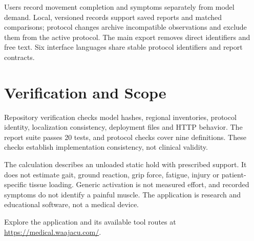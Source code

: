 Users record movement completion and symptoms separately from model demand.
Local, versioned records support saved reports and matched comparisons;
protocol changes archive incompatible observations and exclude them from the
active protocol. The main export removes direct identifiers and free text. Six interface
languages share stable protocol identifiers and report contracts.

\section{Verification and Scope}
Repository verification checks model hashes, regional inventories, protocol
identity, localization consistency, deployment files and HTTP behavior.
The report suite passes 20 tests, and protocol checks cover nine definitions.
These checks establish implementation consistency, not clinical validity.

The calculation describes an unloaded static hold with prescribed support.
It does not estimate gait, ground reaction, grip force, fatigue, injury or
patient-specific tissue loading. Generic activation is not measured effort,
and recorded symptoms do not identify a painful muscle. The application is
research and educational software, not a medical device.

Explore the application and its available tool routes at
\mbox{\url{https://medical.waajacu.com/}}.




